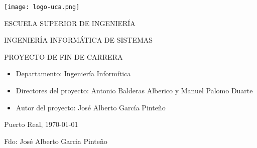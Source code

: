 


\begin{center}

  \texttt{[image: logo-uca.png]} \\

  \vspace{2.5cm}

  \Large{ESCUELA SUPERIOR DE INGENIERÍA} \\

  \vspace{1.0cm}

  \large{INGENIERÍA INFORMÁTICA DE SISTEMAS} \\

  \vspace{2.0cm}

  \large{PROYECTO DE FIN DE CARRERA} \\

  \vspace{2.5cm}

\end{center}

\begin{itemize}
\item \large{Departamento: Ingeniería Informítica}
\item \large{Directores del proyecto: Antonio Balderas Alberico y Manuel Palomo Duarte}
\item \large{Autor del proyecto: José Alberto García Pinteño}
\end{itemize}

\vspace{0.2cm}

\begin{flushright}
  \large{Puerto Real, \today} \\

  \vspace{2.5cm}

  \large{Fdo: José Alberto Garcia Pinteño}
\end{flushright}
